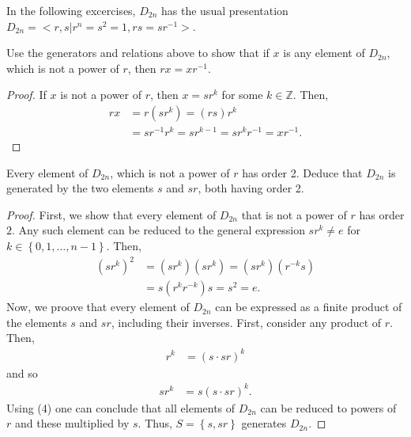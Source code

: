 \documentclass[12pt]{article}
\newcommand{\Z}{\mathbb{Z}}
\newenvironment{problem}[2][Problem]{\begin{trivlist} \item[\hskip \labelsep {\bfseries #1}\hskip \labelsep {\bfseries #2.}]}{\end{trivlist}}
\begin{document}
In the following excercises, $D_{2n}$ has the usual presentation $D_{2n}=<r,s|r^{n}=s^{2}=1,rs=sr^{-1}>$.
\begin{problem}{2}
  Use the generators and relations above to show that if $x$ is any element of $D_{2n}$, which is not a power of $r$, then $rx = xr^{-1}$.
\begin{proof}
  If $x$ is not a power of $r$, then $x=sr^{k}$ for some $k\in\Z$. Then, 
\begin{align*}
  rx &= r\left( sr^{k} \right) = \left( rs \right)r^{k}\\
  &= sr^{-1}r^{k} = sr^{k-1} = sr^{k}r^{-1} = xr^{-1}.
\end{align*}
\end{proof}
\end{problem}
\begin{problem}{3}
  Every element of $D_{2n}$, which is not a power of $r$ has order 2. Deduce that $D_{2n}$ is generated by the two elements $s$ and $sr$, both having order 2. 
\begin{proof}
  First, we show that every element of $D_{2n}$ that is not a power of $r$ has order $2$. Any such element can be reduced to the general expression $sr^{k}\neq e$ for $k\in\left\{ 0,1,\dots,n-1 \right\}$. Then, 
\begin{align*}
  (sr^{k})^{2} &= (sr^{k})(sr^{k}) = (sr^{k})(r^{-k}s)\\
  &= s(r^{k}r^{-k})s = s^{2} = e.
\end{align*}
Now, we proove that every element of $D_{2n}$ can be expressed as a finite product of the elements $s$ and $sr$, including their inverses. First, consider any product of $r$. Then, 
\begin{align*}
  r^{k} &= (s\cdot sr)^{k}
\end{align*}
and so
\begin{align*}
  sr^{k} &= s(s\cdot sr)^{k}.
\end{align*}
Using (4) one can conclude that all elements of $D_{2n}$ can be reduced to powers of $r$ and these multiplied by $s$. Thus, $S=\left\{ s,sr \right\}$ generates $D_{2n}$.
\end{proof}
\end{problem}
       
\end{document}
